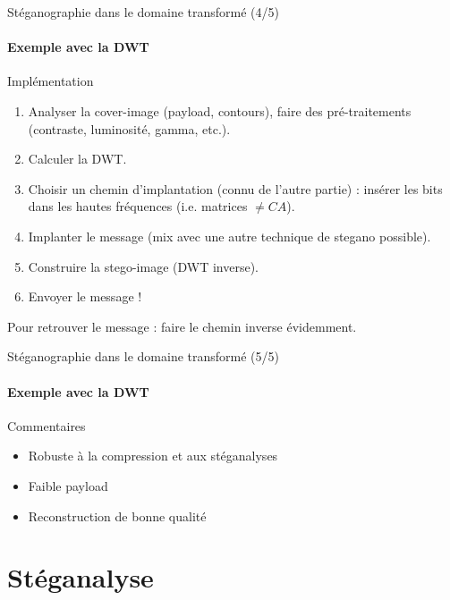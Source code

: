 \documentclass{beamer}
\begin{document}
	\begin{frame}{Stéganographie dans le domaine transformé (4/5)}
		\framesubtitle{Exemple avec la DWT}
		\begin{block}{Implémentation}
			\begin{enumerate}
				\item Analyser la cover-image (payload, contours), faire des pré-traitements (contraste, luminosité, gamma, etc.).
				\item Calculer la DWT.
				\item Choisir un chemin d'implantation (connu de l'autre partie) : insérer les bits dans les hautes fréquences (i.e. matrices $\neq CA$).
				\item Implanter le message (mix avec une autre technique de stegano possible).
				\item Construire la stego-image (DWT inverse).
				\item Envoyer le message !
			\end{enumerate}
		Pour retrouver le message : faire le chemin inverse évidemment.
		\end{block}
	\end{frame}

	\begin{frame}{Stéganographie dans le domaine transformé (5/5)}
	\framesubtitle{Exemple avec la DWT}
		\begin{block}{Commentaires}
			\begin{itemize}
				\item Robuste à la compression et aux stéganalyses
				\item Faible payload
				\item Reconstruction de bonne qualité
			\end{itemize}
		\end{block}
	\end{frame}
	
	
	
	
	\section{Stéganalyse}
	
\end{document}
